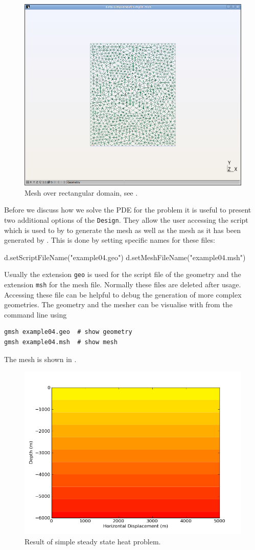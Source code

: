 \begin{figure}[ht]
\centerline{\includegraphics[width=4.in]{figures/simplemesh}}
\caption{Mesh over rectangular domain, see .}
\label{fig:pycad rec mesh}
\end{figure}

Before we discuss how we solve the PDE for the 
problem it is useful to present two additional options of the \verb|Design|. 
They allow the user accessing the script which is used to by \gmsh to generate the mesh as well as
the mesh as it has been generated by \gmsh. This is done by setting specific names for these files: 
\begin{python}
d.setScriptFileName("example04.geo")
d.setMeshFileName("example04.msh")
\end{python}
Usually the extension \texttt{geo} is used for the script file of the \gmsh geometry and
the extension \texttt{msh} for the mesh file. Normally these files are deleted after usage. 
Accessing these file can be helpful to debug the generation of more complex geometries. The geometry and the mesher can be visualise with \gmsh from the command line using
\begin{verbatim}
gmsh example04.geo  # show geometry
gmsh example04.msh  # show mesh
\end{verbatim}
The mesh is shown in .
\begin{figure}[ht]
\centerline{\includegraphics[width=4.in]{figures/simpleheat}}
\caption{Result of simple steady state heat problem.}
\label{fig:steady state heat}
\end{figure}


